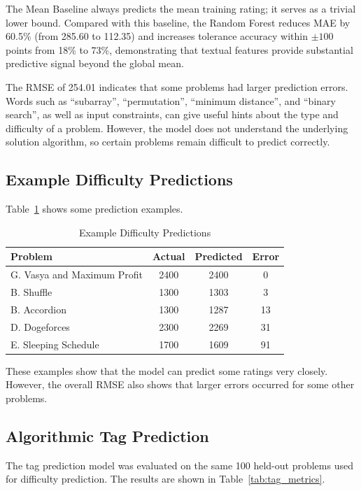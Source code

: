 \documentclass[conference]{IEEEtran}
\begin{document}
The Mean Baseline always predicts the mean training rating; it serves as a
trivial lower bound. Compared with this baseline, the Random Forest
reduces MAE by 60.5\% (from 285.60 to 112.35) and increases tolerance
accuracy within $\pm100$ points from 18\% to 73\%, demonstrating that
textual features provide substantial predictive signal beyond the global
mean.

The RMSE of 254.01 indicates that some problems had larger prediction
errors. Words such as ``subarray'', ``permutation'', ``minimum distance'',
and ``binary search'', as well as input constraints, can give useful hints
about the type and difficulty of a problem. However, the model does not
understand the underlying solution algorithm, so certain problems remain
difficult to predict correctly.

\subsection{Example Difficulty Predictions}

Table~\ref{tab:example_predictions} shows some prediction examples.

\begin{table}[htbp]
\caption{Example Difficulty Predictions}
\centering
\begin{tabular}{lccc}
\toprule
Problem & Actual & Predicted & Error \\
\midrule
G. Vasya and Maximum Profit & 2400 & 2400 & 0 \\
B. Shuffle & 1300 & 1303 & 3 \\
B. Accordion & 1300 & 1287 & 13 \\
D. Dogeforces & 2300 & 2269 & 31 \\
E. Sleeping Schedule & 1700 & 1609 & 91 \\
\bottomrule
\end{tabular}
\label{tab:example_predictions}
\end{table}

These examples show that the model can predict some ratings very closely.
However, the overall RMSE also shows that larger errors occurred for some
other problems.

\subsection{Algorithmic Tag Prediction}

The tag prediction model was evaluated on the same 100 held-out problems
used for difficulty prediction. The results are shown in
Table~\ref{tab:tag_metrics}.
\end{document}
